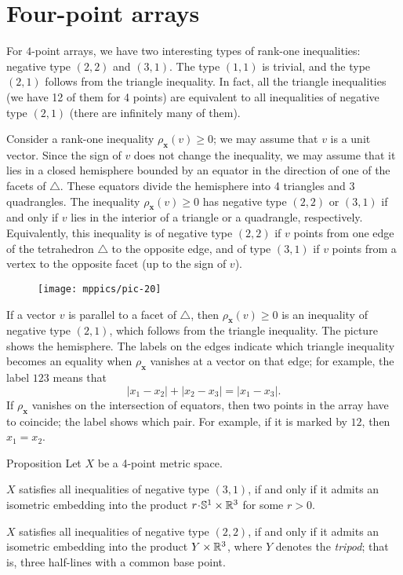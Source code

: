 \documentclass[a4paper,10pt]{article}
\begin{document}
\section{Four-point arrays}\label{Four-point arrays}

For $4$-point arrays, we have two interesting types of rank-one inequalities: negative type $(2,2)$ and $(3,1)$.
The type $(1,1)$ is trivial, and
the type $(2,1)$ follows from the triangle inequality.
In fact, all the triangle inequalities (we have 12 of them for 4 points) are equivalent to all inequalities of negative type $(2,1)$ (there are infinitely many of them).

Consider a rank-one inequality $\rho_{\bm{x}}(v)\ge 0$; we may assume that $v$ is a unit vector.
Since the sign of $v$ does not change the inequality, we may assume that it lies in a closed hemisphere bounded by an equator in the direction of one of the facets of $\triangle$.
These equators divide the hemisphere into 4 triangles and 3 quadrangles.
The inequality $\rho_{\bm{x}}(v)\ge 0$ has negative type $(2,2)$ or $(3,1)$
if and only if $v$ lies in the interior of a triangle or a quadrangle, respectively.
Equivalently, this inequality is of negative type $(2,2)$ if $v$ points from one edge of the tetrahedron $\triangle$ to the opposite edge, and of type $(3,1)$ if $v$ points from a vertex to the opposite facet (up to the sign of $v$).

\begin{wrapfigure}{o}{36mm}
\centering
\vskip-3mm
\texttt{[image: mppics/pic-20]}
\vskip-0mm
\end{wrapfigure}

If a vector $v$ is parallel to a facet of $\triangle$, then $\rho_{\bm{x}}(v)\ge 0$ is an inequality of negative type $(2,1)$, which follows from the triangle inequality.
The picture shows the hemisphere.
The labels on the edges indicate which triangle inequality becomes an equality when $\rho_{\bm{x}}$ vanishes at a vector on that edge;
for example, the label $123$ means that
\[|x_1-x_2|+|x_2-x_3|=|x_1-x_3|.\]
If $\rho_{\bm{x}}$ vanishes on the intersection of equators, then two points in the array have to coincide;
the label shows which pair.
For example, if it is marked by $12$, then $x_1=x_2$.

\begin{thm}{Proposition}\label{prop:Four-point arrays}
Let $X$ be a 4-point metric space.

$X$ satisfies all inequalities of negative type $(3, 1)$, if and only if it admits an isometric embedding into the product $r\cdot \mathbb{S}^1\times\RR^3$ for some $r>0$.

$X$ satisfies all inequalities of negative type $(2, 2)$, if and only if it admits an isometric embedding into the product $Y\times\mathbb{R}^3$, where $Y$ denotes the \emph{tripod};
that is, three half-lines with a common base point.
\end{thm}
\end{document}
